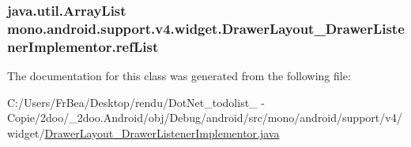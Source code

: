 \hypertarget{classmono_1_1android_1_1support_1_1v4_1_1widget_1_1_drawer_layout___drawer_listener_implementor_1cf2af08cab7def400914e1842c729de}{
\subsubsection[{refList}]{\setlength{\rightskip}{0pt plus 5cm}java.util.ArrayList {\bf mono.android.support.v4.widget.DrawerLayout\_\-DrawerListenerImplementor.refList}}}
\label{classmono_1_1android_1_1support_1_1v4_1_1widget_1_1_drawer_layout___drawer_listener_implementor_1cf2af08cab7def400914e1842c729de}




The documentation for this class was generated from the following file:\begin{CompactItemize}
\item 
C:/Users/FrBea/Desktop/rendu/DotNet\_\-todolist\_ - Copie/2doo/\_\-2doo.Android/obj/Debug/android/src/mono/android/support/v4/widget/\hyperlink{_drawer_layout___drawer_listener_implementor_8java}{DrawerLayout\_\-DrawerListenerImplementor.java}\end{CompactItemize}
